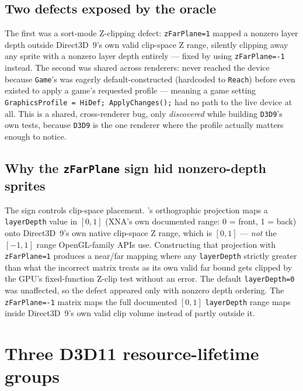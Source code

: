 \subsection{Two defects exposed by the oracle}

The first was a sort-mode Z-clipping defect: \texttt{zFarPlane=1}
mapped a nonzero  layer depth outside Direct3D~9's own valid clip-space
Z range, silently clipping away any sprite with a nonzero layer depth entirely --- fixed by
using \texttt{zFarPlane=-1} instead. The second was shared across renderers:
 never reached the device because \texttt{Game}'s
 was eagerly default-constructed
(hardcoded to \texttt{Reach}) before  even existed to apply a
game's requested profile --- meaning a game setting \texttt{GraphicsProfile = HiDef;
ApplyChanges();} had no path to the live device at all. This is a shared, cross-renderer bug,
only \emph{discovered} while building \texttt{D3D9}'s own tests, because \texttt{D3D9} is the
one renderer where the profile actually matters enough to notice.

\subsection{Why the \texttt{zFarPlane} sign hid nonzero-depth sprites}

The sign controls clip-space placement. 's orthographic projection maps a
\texttt{layerDepth} value in $[0, 1]$ (XNA's own documented range: 0 = front, 1 = back) onto
Direct3D~9's own native clip-space Z range, which is $[0, 1]$ --- \emph{not} the
$[-1, 1]$ range OpenGL-family APIs use. Constructing that projection with
\texttt{zFarPlane=1} produces a near/far mapping where any \texttt{layerDepth} strictly
greater than what the incorrect matrix treats as its own valid far bound gets clipped by the
GPU's fixed-function Z-clip test without an error. The default \texttt{layerDepth=0} was
unaffected, so the defect appeared only with nonzero depth ordering. The
\texttt{zFarPlane=-1} matrix maps the
full documented $[0,1]$ \texttt{layerDepth} range maps inside Direct3D~9's own valid clip
volume instead of partly outside it.

\section{Three D3D11 resource-lifetime groups}
\label{sec:d3d11-lifetime-groups}

